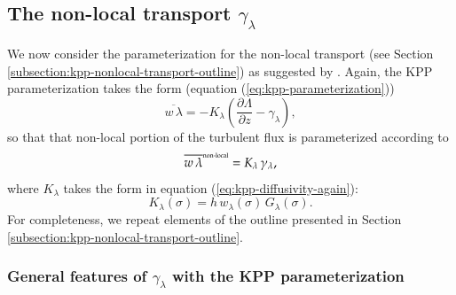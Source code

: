\subsection{The non-local transport $\gamma_{\lambda}$}
\label{subsection:kpp-non-local-transport}

We now consider the parameterization for the non-local transport (see
Section \ref{subsection:kpp-nonlocal-transport-outline}) as suggested
by \cite{LargeKPP}.  Again, the KPP parameterization takes the form
(equation (\ref{eq:kpp-parameterization}))
\begin{equation}
  \overline{w \, \lambda} = -K_{\lambda} \left( \frac{\partial \Lambda}{\partial z} - \gamma_{\lambda} \right),
\label{eq:kpp-parameterization-yet-again}
\end{equation}
so that that non-local portion of the turbulent flux is parameterized
according to
\begin{equation}
 \overline{w \, \lambda}^{\mbox{\tiny non-local}} = K_{\lambda}  \, \gamma_{\lambda},  
\end{equation}
where $K_{\lambda}$ takes the form in equation
(\ref{eq:kpp-diffusivity-again}): 
\begin{equation}
 K_{\lambda}(\sigma) = h \, w_{\lambda}(\sigma) \, G_{\lambda}(\sigma).
\label{eq:kpp-diffusivity-yet-again}
\end{equation}
For completeness, we repeat elements of the outline presented in
Section \ref{subsection:kpp-nonlocal-transport-outline}.


\subsubsection{General features of $\gamma_{\lambda}$ with the KPP parameterization}

